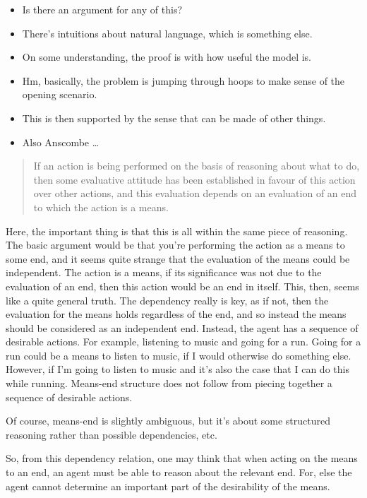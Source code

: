 \documentclass[10pt]{article}
\begin{document}
\begin{itemize}
\item Is there an argument for any of this?
\item There's intuitions about natural language, which is something else.
\item On some understanding, the proof is with how useful the model is.
\item Hm, basically, the problem is jumping through hoops to make sense of the opening scenario.
\item This is then supported by the sense that can be made of other things.
\item Also Anscombe \dots
\end{itemize}

\newpage

\begin{quote}
  If an action is being performed on the basis of reasoning about what to do, then some evaluative attitude has been established in favour of this action over other actions, and this evaluation depends on an evaluation of an end to which the action is a means.
\end{quote}
Here, the important thing is that this is all within the same piece of reasoning.
The basic argument would be that you're performing the action as a means to some end, and it seems quite strange that the evaluation of the means could be independent.
The action is a means, if its significance was not due to the evaluation of an end, then this action would be an end in itself.
This, then, seems like a quite general truth.
The dependency really is key, as if not, then the evaluation for the means holds regardless of the end, and so instead the means should be considered as an independent end.
Instead, the agent has a sequence of desirable actions.
For example, listening to music and going for a run.
Going for a run could be a means to listen to music, if I would otherwise do something else.
However, if I'm going to listen to music and it's also the case that I can do this while running.
Means-end structure does not follow from piecing together a sequence of desirable actions.

Of course, means-end is slightly ambiguous, but it's about some structured reasoning rather than possible dependencies, etc.

So, from this dependency relation, one may think that when acting on the means to an end, an agent must be able to reason about the relevant end.
For, else the agent cannot determine an important part of the desirability of the means.
\end{document}
